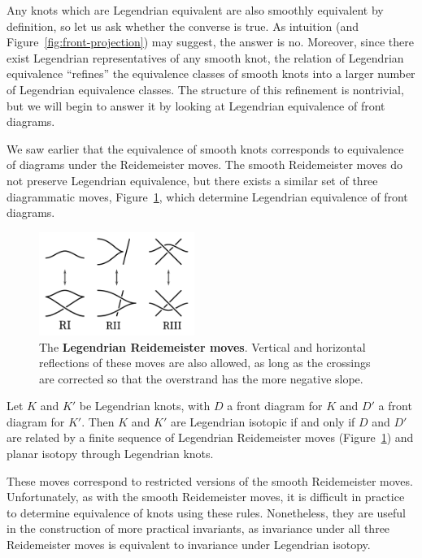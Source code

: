 Any knots which are Legendrian equivalent are also smoothly equivalent by definition, so let us ask whether the converse is true.
As intuition (and Figure~\ref{fig:front-projection}) may suggest, the answer is no. Moreover, since there exist Legendrian representatives of any smooth knot, the relation of Legendrian equivalence ``refines'' the equivalence classes of smooth knots into a larger number of Legendrian equivalence classes.
The structure of this refinement is nontrivial, but we will begin to answer it by looking at Legendrian equivalence of front diagrams.

We saw earlier that the equivalence of smooth knots corresponds to equivalence of diagrams under the Reidemeister moves. The smooth Reidemeister moves do not preserve Legendrian equivalence, but there exists a similar set of three diagrammatic moves, Figure~\ref{fig:redemeister}, which determine Legendrian equivalence of front diagrams.

\begin{figure}[ht]
    \centering
    \includegraphics[width=0.45\textwidth]{images/redeimeister.pdf}
    \caption{The \textbf{Legendrian Reidemeister moves}. Vertical and horizontal reflections of these moves are also allowed, as long as the crossings are corrected so that the overstrand has the more negative slope.}%
    \label{fig:redemeister}
\end{figure}

\begin{theorem}
    Let $K$ and $K'$ be Legendrian knots, with $D$ a front diagram for $K$ and $D'$ a front diagram for $K'$.
    Then $K$ and $K'$ are Legendrian isotopic if and only if $D$ and $D'$ are related by a finite sequence of Legendrian Reidemeister moves (Figure~\ref{fig:redemeister}) and planar isotopy through Legendrian knots.
\end{theorem}

These moves correspond to restricted versions of the smooth Reidemeister moves.
Unfortunately, as with the smooth Reidemeister moves, it is difficult in practice to determine equivalence of knots using these rules. Nonetheless, they are useful in the construction of more practical invariants, as invariance under all three Reidemeister moves is equivalent to invariance under Legendrian isotopy.



